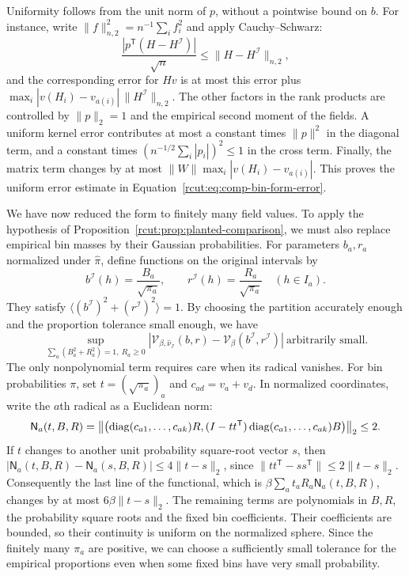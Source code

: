 Uniformity follows from the unit norm of $p$, without a pointwise
bound on $b$.  For instance, write
$\|f\|_{n,2}^2=n^{-1}\sum_i f_i^2$ and apply Cauchy--Schwarz:
\[
 \frac{|p^{\mathsf T}(H-H^{\mathcal I})|}{\sqrt n}
       \le\|H-H^{\mathcal I}\|_{n,2},
\]
and the corresponding error for $Hv$ is at most this error plus
$\max_i|v(H_i)-v_{a(i)}|\,\|H^{\mathcal I}\|_{n,2}$.
The other factors in the rank products are controlled by $\|p\|_2=1$
and the empirical second moment of the fields.  A uniform kernel
error contributes at most a constant times $\|p\|^2$ in the diagonal
term, and a constant times
$(n^{-1/2}\sum_i|p_i|)^2\le1$ in the cross term.  Finally, the
matrix term changes by at most
$\|W\|\max_i|v(H_i)-v_{a(i)}|$.  This proves the uniform error
estimate in Equation~\eqref{rcut:eq:comp-bin-form-error}.

We have now reduced the form to finitely many field values.  To apply
the hypothesis of Proposition~\ref{rcut:prop:planted-comparison}, we must
also replace empirical bin masses by their Gaussian probabilities.
For parameters $b_a,r_a$ normalized under $\widehat\pi$, define
functions on the original intervals by
\begin{equation}
 b^{\mathcal I}(h)=\frac{B_a}{\sqrt{\pi_a}},\qquad
 r^{\mathcal I}(h)=\frac{R_a}{\sqrt{\pi_a}}
       \quad(h\in I_a).
 \label{rcut:eq:comp-mass-rescaling}
\end{equation}
They satisfy $\langle(b^{\mathcal I})^2+(r^{\mathcal I})^2\rangle=1$.
By choosing the partition accurately enough and the proportion
tolerance small enough, we have
\begin{equation}
 \sup_{\sum_a(B_a^2+R_a^2)=1,\ R_a\ge0}
 \left|\mathcal V_{\beta,\widehat\nu_{\mathcal I}}(b,r)
       -\mathcal V_\beta(b^{\mathcal I},r^{\mathcal I})\right|
       \ \text{arbitrarily small}.
 \label{rcut:eq:comp-functional-approximation}
\end{equation}
The only nonpolynomial term requires care when its radical vanishes.
For bin probabilities $\pi$, set $t=(\sqrt{\pi_a})_a$ and
$c_{ad}=v_a+v_d$.  In normalized coordinates, write the $a$th
radical as a Euclidean norm:
\begin{equation}
 \mathsf N_a(t,B,R)=
 \left\|\left(\operatorname{diag}(c_{a1},\ldots,c_{ak})R,
       (I-tt^{\mathsf T})\operatorname{diag}(c_{a1},\ldots,c_{ak})B\right)\right\|_2
       \le2.
 \label{rcut:eq:comp-normalized-radical}
\end{equation}
If $t$ changes to another unit probability square-root vector $s$,
then $|\mathsf N_a(t,B,R)-\mathsf N_a(s,B,R)|\le4\|t-s\|_2$, since
$\|tt^{\mathsf T}-ss^{\mathsf T}\|\le2\|t-s\|_2$.
Consequently the last line of the functional, which is
$\beta\sum_at_aR_a\mathsf N_a(t,B,R)$, changes by at most
$6\beta\|t-s\|_2$.
The remaining terms are polynomials in $B,R$, the probability square
roots and the fixed bin coefficients.  Their coefficients are bounded,
so their continuity is uniform on the normalized sphere.  Since the
finitely many $\pi_a$ are positive, we can choose a sufficiently small
tolerance for the empirical proportions even when some fixed bins
have very small probability.

